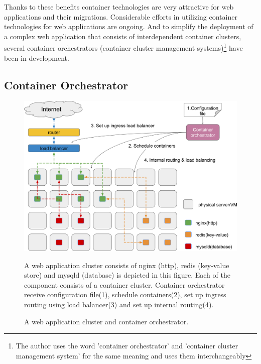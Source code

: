 Thanks to these benefits\added[id=2nd]{,} container technologies are very attractive for  web applications and  their migrations.
Considerable efforts in utilizing container technologies for web applications are ongoing.
And to simplify the deployment of a complex web application that consists of interdependent container clusters, several container orchestrators (container cluster management systems)\footnote{The author uses the word 'container orchestrator' and 'container cluster management system' for the same meaning and uses them interchangeably} have been in development.

\subsection{Container Orchestrator}

\begin{figure}[h]
\begin{center}
\includegraphics[width=0.9\columnwidth]{Figs/container_management_system}
\end{center}
\caption{
A web application cluster and container orchestrator.
}
\centering\parbox[c]{0.9\columnwidth}{
A web application cluster consists of nginx (http), redis (key-value store) and mysqld (database) is depicted in this figure. 
Each of the component consists of a container cluster.
Container orchestrator receive configuration file(1), schedule containers(2), set up ingress routing using load balancer(3) and set up internal routing(4).
}
\label{fig:container_management_system}
\end{figure}

